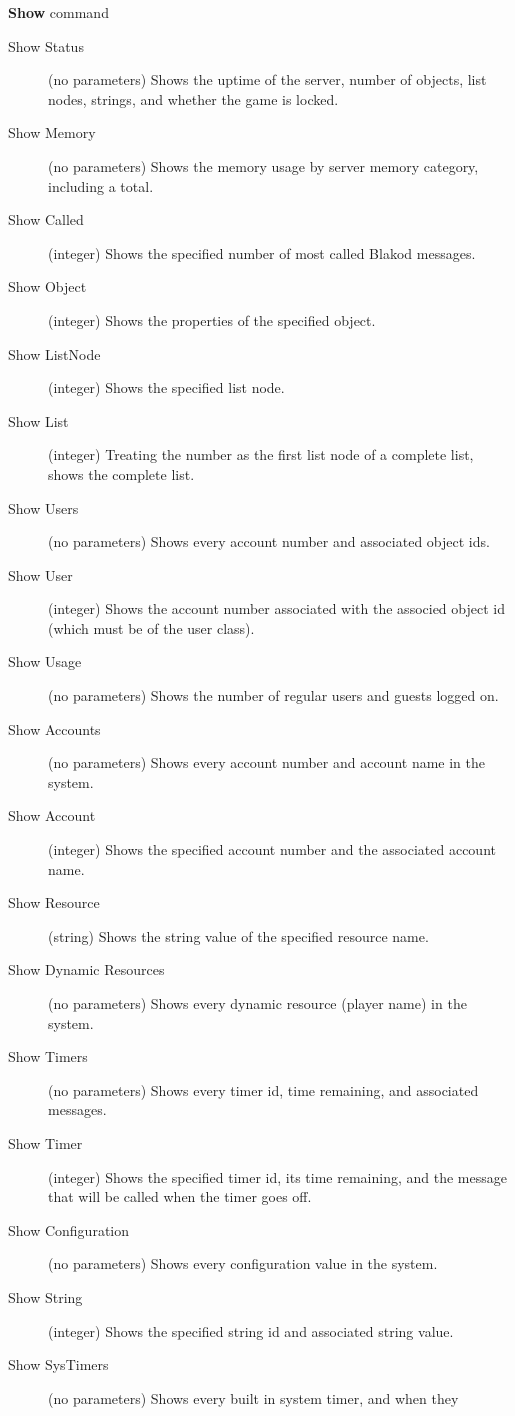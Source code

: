 \textbf{Show} command
\begin{description}

\item[Show Status] (no parameters) Shows the uptime of the server, number of objects,
list nodes, strings, and whether the game is locked. 
\item[Show Memory] (no parameters) Shows the memory usage by server memory category, 
including a total.
\item[Show Called] (integer) Shows the specified number of most called Blakod messages.
\item[Show Object] (integer) Shows the properties of the specified object.
\item[Show ListNode] (integer) Shows the specified list node.
\item[Show List] (integer) Treating the number as the first list node of a complete list,
shows the complete list.
\item[Show Users] (no parameters) Shows every account number and associated object ids.
\item[Show User] (integer) Shows the account number associated with the associed object
id (which must be of the user class).
\item[Show Usage] (no parameters) Shows the number of regular users and guests logged on.
\item[Show Accounts] (no parameters) Shows every account number and account name in
the system.
\item[Show Account] (integer) Shows the specified account number and the associated
account name.
\item[Show Resource] (string) Shows the string value of the specified resource name.
\item[Show Dynamic Resources] (no parameters) Shows every dynamic resource (player name)
in the system.
\item[Show Timers] (no parameters) Shows every timer id, time remaining, and associated
messages.
\item[Show Timer] (integer) Shows the specified timer id, its time remaining, and the
message that will be called when the timer goes off.
\item[Show Configuration] (no parameters) Shows every configuration value in the system.
\item[Show String] (integer) Shows the specified string id and associated string value.
\item[Show SysTimers] (no parameters) Shows every built in system timer, and when they

\end{description}
